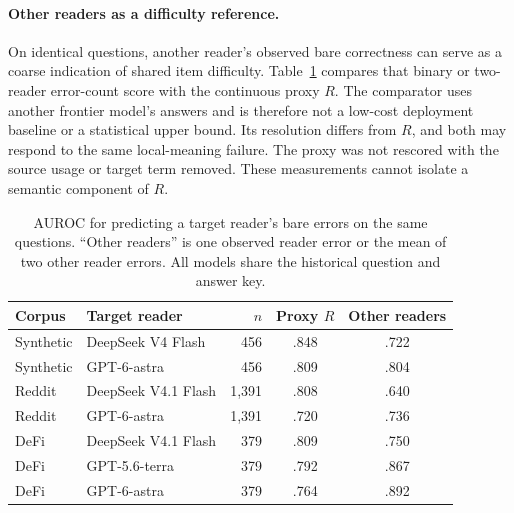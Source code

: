 \paragraph{Other readers as a difficulty reference.}\label{app:reader-difficulty}
On identical questions, another reader's observed bare correctness can serve as a coarse indication of shared item difficulty. Table~\ref{tab:reader-difficulty} compares that binary or two-reader error-count score with the continuous proxy $R$. The comparator uses another frontier model's answers and is therefore not a low-cost deployment baseline or a statistical upper bound. Its resolution differs from $R$, and both may respond to the same local-meaning failure. The proxy was not rescored with the source usage or target term removed. These measurements cannot isolate a semantic component of $R$.

\begin{table}[h]\centering\footnotesize
\caption{AUROC for predicting a target reader's bare errors on the same questions. ``Other readers'' is one observed reader error or the mean of two other reader errors. All models share the historical question and answer key.}
\label{tab:reader-difficulty}
\begin{tabular}{@{}llrcc@{}}\toprule
Corpus & Target reader & $n$ & Proxy $R$ & Other readers\\\midrule
Synthetic & DeepSeek V4 Flash & 456 & .848 & .722\\
Synthetic & GPT-6-astra & 456 & .809 & .804\\
Reddit & DeepSeek V4.1 Flash & 1,391 & .808 & .640\\
Reddit & GPT-6-astra & 1,391 & .720 & .736\\
DeFi & DeepSeek V4.1 Flash & 379 & .809 & .750\\
DeFi & GPT-5.6-terra & 379 & .792 & .867\\
DeFi & GPT-6-astra & 379 & .764 & .892\\\bottomrule
\end{tabular}
\end{table}
